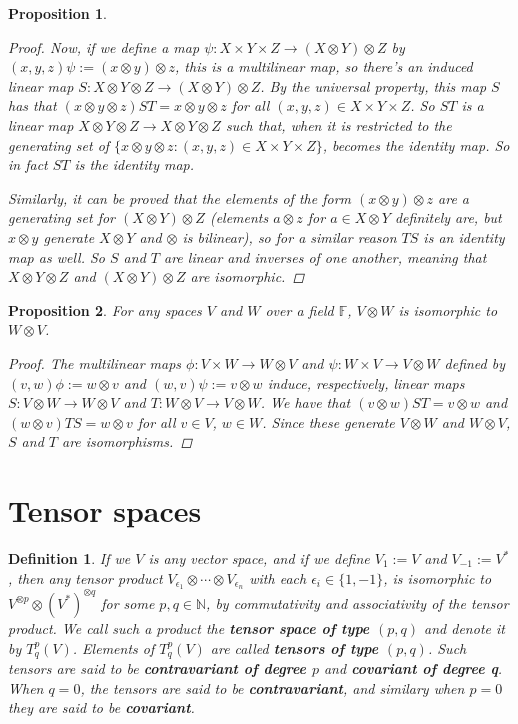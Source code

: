 \documentclass[a4paper,14pt]{article}
\newtheorem*{prop}{Proposition}
\newtheorem*{defn}{Definition}
\begin{document}
\begin{prop}
\begin{proof}
Now, if we define a map $\psi: X \times Y \times Z \to (X \otimes Y) \otimes Z$ by $(x, y, z) \psi := (x \otimes y) \otimes z$, this is a multilinear map, so there's an induced linear map $S: X \otimes Y \otimes Z \to (X \otimes Y) \otimes Z$. By the universal property, this map $S$ has that $(x \otimes y \otimes z) ST = x \otimes y \otimes z$ for all $(x, y, z) \in X \times Y \times Z$. So $ST$ is a linear map $X \otimes Y \otimes Z \to X \otimes Y \otimes Z$ such that, when it is restricted to the generating set of $\{x \otimes y \otimes z : (x, y, z) \in X \times Y \times Z\}$, becomes the identity map. So in fact $ST$ is the identity map.

Similarly, it can be proved that the elements of the form $(x \otimes y) \otimes z$ are a generating set for $(X \otimes Y) \otimes Z$ (elements $a \otimes z$ for $a \in X \otimes Y$ definitely are, but $x \otimes y$ generate $X \otimes Y$ and $\otimes$ is bilinear), so for a similar reason $TS$ is an identity map as well. So $S$ and $T$ are linear and inverses of one another, meaning that $X \otimes Y \otimes Z$ and $(X \otimes Y) \otimes Z$ are isomorphic.
\end{proof}
\end{prop}

\begin{prop}
For any spaces $V$ and $W$ over a field $\mathbb{F}$, $V \otimes W$ is isomorphic to $W \otimes V$.
\begin{proof}
    The multilinear maps $\phi: V \times W \to W \otimes V$ and $\psi: W \times V \to V \otimes W$ defined by $(v, w) \phi := w \otimes v$ and $(w, v) \psi := v \otimes w$ induce, respectively, linear maps $S: V \otimes W \to W \otimes V$ and $T: W \otimes V \to V \otimes W$. We have that $(v \otimes w) ST = v \otimes w$ and $(w \otimes v) TS = w \otimes v$ for all $v \in V$, $w \in W$. Since these generate $V \otimes W$ and $W \otimes V$, $S$ and $T$ are isomorphisms.
\end{proof}
\end{prop}

\section{Tensor spaces}
\begin{defn}
    If we $V$ is any vector space, and if we define $V_1 := V$ and $V_{-1} := V^{\ast}$, then any tensor product $V_{\epsilon_1} \otimes \cdots \otimes V_{\epsilon_n}$ with each $\epsilon_i \in \{1, -1\}$, is isomorphic to $V^{\otimes p} \otimes (V^{\ast})^{\otimes q}$ for some $p, q \in \mathbb{N}$, by commutativity and associativity of the tensor product. We call such a product the \textbf{tensor space of type $(p, q)$} and denote it by $T_q^p(V)$. Elements of $T_q^p(V)$ are called \textbf{tensors of type $(p, q)$}. Such tensors are said to be \textbf{contravariant of degree $p$} and \textbf{covariant of degree q}. When $q = 0$, the tensors are said to be \textbf{contravariant}, and similary when $p = 0$ they are said to be \textbf{covariant}.
\end{defn}
\end{document}
